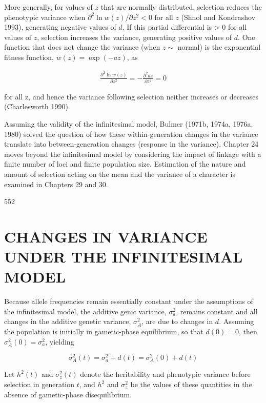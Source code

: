 \documentclass{article}
\begin{document}
More generally, for values of $z$ that are normally distributed, selection reduces the phenotypic variance when $\partial^2 \ln w(z) / \partial z^2 < 0$ for all $z$ (Shnol and Kondrashov 1993), generating negative values of $d$. If this partial differential is > 0 for all values of $z$, selection increases the variance, generating positive values of $d$. One function that does not change the variance (when $z \sim$ normal) is the exponential fitness function, $w(z) = \exp(-az)$, as

\begin{equation}
\begin{align*}\frac{\partial^2\ln w(z)}{\partial z^2}=-\frac{\partial^2az}{\partial z^2}=0\end{align*}
\end{equation}

for all z, and hence the variance following selection neither increases or decreases (Charlesworth 1990).

Assuming the validity of the infinitesimal model, Bulmer (1971b, 1974a, 1976a, 1980) solved the question of how these within-generation changes in the variance translate into between-generation changes (response in the variance). Chapter 24 moves beyond the infinitesimal model by considering the impact of linkage with a finite number of loci and finite population size. Estimation of the nature and amount of selection acting on the mean and the variance of a character is examined in Chapters 29 and 30.

552

\section{CHANGES IN VARIANCE UNDER THE INFINITESIMAL MODEL}
Because allele frequencies remain essentially constant under the assumptions of the infinitesimal model, the additive genic variance,  $ \sigma_a^2 $, remains constant and all changes in the additive genetic variance,  $ \sigma_A^2 $, are due to changes in  $ d $. Assuming the population is initially in gametic-phase equilibrium, so that  $ d(0) = 0 $, then  $ \sigma_A^2(0) = \sigma_a^2 $, yielding

\begin{equation}
\sigma_{A}^{2}(t)=\sigma_{a}^{2}+d(t)=\sigma_{A}^{2}(0)+d(t)
\end{equation}

Let  $ h^2(t) $ and  $ \sigma_z^2(t) $ denote the heritability and phenotypic variance before selection in generation  $ t $, and  $ h^2 $ and  $ \sigma_z^2 $ be the values of these quantities in the absence of gametic-phase disequilibrium.
\end{document}

